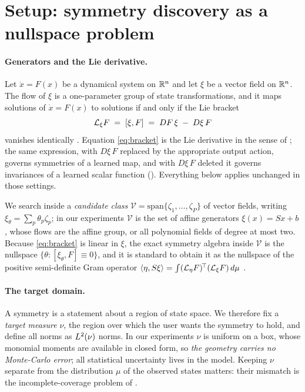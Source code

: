 \section{Setup: symmetry discovery as a nullspace problem}
\label{sec:setup}

\paragraph{Generators and the Lie derivative.} Let $\dot x = F(x)$ be a
dynamical system on $\mathbb{R}^n$ and let $\xi$ be a vector field on $\mathbb{R}^n$. The flow
of $\xi$ is a one-parameter group of state transformations, and it maps
solutions of $\dot x = F(x)$ to solutions if and only if the Lie bracket
\begin{equation}
  \mathcal{L}_\xi F \;=\; [\xi, F] \;=\; DF\,\xi \;-\; D\xi\, F
  \label{eq:bracket}
\end{equation}
vanishes identically \citep[Ch.~2]{olver1993applications}. Equation
\eqref{eq:bracket} is the Lie derivative in the sense of
\citet[Eq.~16]{otto2025unified}; the same expression, with $D\xi\,F$ replaced by
the appropriate output action, governs symmetries of a learned map, and with
$D\xi\,F$ deleted it governs invariances of a learned scalar function
(). Everything below applies unchanged in those settings.

We search inside a \emph{candidate class} $\mathcal V =
\mathrm{span}\{\zeta_1, \dots,\zeta_P\}$ of vector fields, writing $\xi_\theta
= \sum_p \theta_p \zeta_p$; in our experiments $\mathcal V$ is the set of
affine generators $\xi(x) = Sx + b$, whose flows are the affine group, or all
polynomial fields of degree at most two. Because \eqref{eq:bracket} is linear
in $\xi$, the exact symmetry algebra inside $\mathcal V$ is the nullspace
$\{\theta : [\xi_\theta,F] \equiv 0\}$, and it is standard to obtain it as the
nullspace of the positive semi-definite Gram operator $\langle \eta,
S\xi\rangle = \int (\mathcal{L}_\eta F)^{\!\top} (\mathcal{L}_\xi F)\, d\mu$
\citep[\S7]{otto2025unified}.

\paragraph{The target domain.} A symmetry is a statement about a region of
state space. We therefore fix a \emph{target measure} $\nu$, the region over
which the user wants the symmetry to hold, and define all norms as
$L^2(\nu)$ norms. In our experiments $\nu$ is uniform on a box, whose
monomial moments are available in closed form, so \emph{the geometry carries
no Monte-Carlo error}; all statistical uncertainty lives in the model. Keeping
$\nu$ separate from the distribution $\mu$ of the observed states matters:
their mismatch is the incomplete-coverage problem of .

